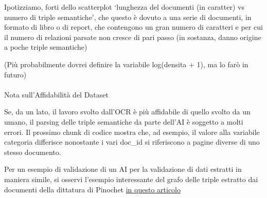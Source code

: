 \documentclass[
  italian,
  a4paper,
]{article}
\makeatletter
\let\oldparagraph\paragraph
\renewcommand{\paragraph}{
    \@ifstar
      \xxxParagraphStar
      \xxxParagraphNoStar
  }
\newcommand{\xxxParagraphStar}[1]{\oldparagraph*{#1}\mbox{}}
\newcommand{\xxxParagraphNoStar}[1]{\oldparagraph{#1}\mbox{}}
\makeatother
\begin{document}
Ipotizziamo, forti dello scatterplot `lunghezza del documenti (in
caratter) vs numero di triple semantiche', che questo è dovuto a una
serie di documenti, in formato di libro o di report, che contengono un
gran numero di caratteri e per cui il numero di relazioni parsate non
cresce di pari passo (in sostanza, danno origine a poche triple
semantiche)

(Più probabilmente dovrei definire la variabile log(densita + 1), ma lo
farò in futuro)

\paragraph{Nota sull'Affidabilità del
Dataset}\label{nota-sullaffidabilituxe0-del-dataset}

Se, da un lato, il lavoro svolto dall'OCR è più affidabile di quello
svolto da un umano, il parsing delle triple semantiche da parte dell'AI
è soggetto a molti errori. Il prossimo chunk di codice mostra che, ad
esempio, il valore alla variabile categoria differisce nonostante i vari
doc\_id si riferiscono a pagine diverse di uno stesso documento.

Per un esempio di validazione di un AI per la validazione di dati
estratti in maniera simile, si osservi l'esempio interessante del grafo
delle triple estratto dai documenti della dittatura di Pinochet
\href{https://arxiv.org/abs/2408.11975}{in questo articolo}
\end{document}
